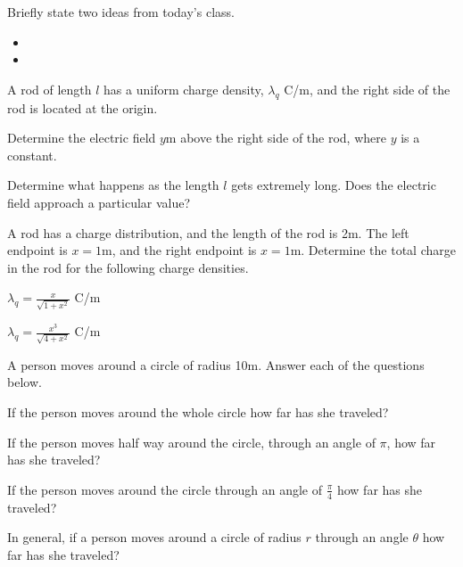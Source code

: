 \postClass

\begin{problem}
\item Briefly state two ideas from today's class.
  \begin{itemize}
  \item
  \item
  \end{itemize}
\item A rod of length $l$ has a uniform charge density, $\lambda_q$ C/m,
    and the right side of the rod is located at the origin.
    \begin{subproblem}
      \item Determine the electric field $y$m above the right side of the rod,
        where $y$ is a constant.
      \item Determine what happens as the length $l$ gets extremely long.
        Does the electric field approach a particular value?
    \end{subproblem}
\item A rod has a charge distribution, and the length of the rod is
  2m. The left endpoint is $x=1$m, and the right endpoint is
  $x=1$m. Determine the total charge in the rod for the following
  charge densities.
  \begin{subproblem}
    \item $\lambda_q = \frac{x}{\sqrt{1+x^2}}$ C/m
      \vfill
    \item $\lambda_q = \frac{x^3}{\sqrt{4+x^2}}$ C/m
      \vfill
  \end{subproblem}
\end{problem}



\begin{problem}
\item A person moves around a circle of radius 10m. Answer each of the questions below.
  \begin{subproblem}
  \item If the person moves around the whole circle how far has she traveled?
    \vfill
  \item If the person moves half way around the circle, through an angle of $\pi$, how far has she traveled?
    \vfill
  \item If the person moves around the circle through an angle of $\frac{\pi}{4}$ how far has she traveled?
    \vfill
  \item In general, if a person moves around a circle of radius $r$ through an angle $\theta$ how far has she traveled?
      \vfill
  \end{subproblem}
\end{problem}




